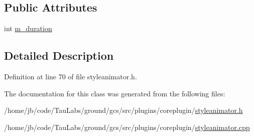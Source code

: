 \subsection*{\-Public \-Attributes}
\begin{DoxyCompactItemize}
\item 
int \hyperlink{group___core_plugin_ga639f199e1b6793134583974181d4c072}{m\-\_\-duration}
\end{DoxyCompactItemize}


\subsection{\-Detailed \-Description}


\-Definition at line 70 of file styleanimator.\-h.



\-The documentation for this class was generated from the following files\-:\begin{DoxyCompactItemize}
\item 
/home/jb/code/\-Tau\-Labs/ground/gcs/src/plugins/coreplugin/\hyperlink{styleanimator_8h}{styleanimator.\-h}\item 
/home/jb/code/\-Tau\-Labs/ground/gcs/src/plugins/coreplugin/\hyperlink{styleanimator_8cpp}{styleanimator.\-cpp}\end{DoxyCompactItemize}
